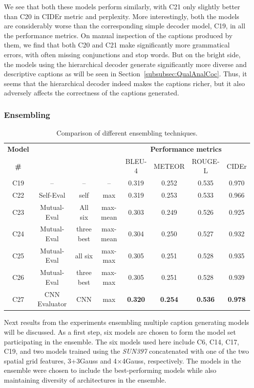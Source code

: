 We see that both these models perform similarly, with C21 only slightly better
than C20 in CIDEr metric and perplexity.
More interestingly, both the models are considerably worse than the
corresponding simple decoder model, C19, in all the performance metrics.
On manual inspection of the captions produced by them, we find that both C20 and
C21 make significantly more grammatical errors, with often missing conjunctions
and stop words.
But on the bright side, the models using the hierarchical decoder generate
significantly more diverse and descriptive captions as will be seen in
Section~\ref{subsubsec:QualAnalCoc}.
Thus, it seems that the hierarchical decoder indeed makes the captions richer,
but it also adversely affects the correctness of the captions generated.

\subsubsection{Ensembling}
\begin{table}[htp]
  \centering
  \newcommand{\bs}{\small}
  \begin{adjustbox}{center}
  \begin{tabular}{|c|c|c|c|c|c|c|c|}
    \hline
    \bf Model & \bf \multirow{2}{*}{Method} & \bf \multirow{2}{*}{Evaluators}&
    \bf \multirow{2}{*}{Eval type}  & \multicolumn{4}{c|}{\bf Performance metrics}\\
    \cline{5-8}
    \bf \# & & & &\bs BLEU-4 &\bs METEOR &\bs ROUGE-L &\bs CIDEr\\\hline
    C19 & --    & -- & -- & 0.319 & 0.252 & 0.535 & 0.970\\\hline
    C22 & Self-Eval & self      & max      & 0.319 & 0.253 & 0.533 & 0.966\\\hline
    C23 & Mutual-Eval      &  All six  & max-mean & 0.303 & 0.249 & 0.526 & 0.925\\
    C24 & Mutual-Eval      &three best & max-mean & 0.304 & 0.250 & 0.527 &
    0.932\\\cline{3-8}
    C25 & Mutual-Eval      & all six & max-max  & 0.305 & 0.251 & 0.528 & 0.935\\
    C26 & Mutual-Eval      & three best & max-max  & 0.305 & 0.251 & 0.528 & 0.939\\\hline
    C27 & CNN Evaluator    & CNN  & max&\bf0.320&\bf0.254 &\bf0.536 &\bf0.978\\\hline
  \end{tabular}
  \end{adjustbox}
  \caption{Comparison of different ensembling techniques.}
  \label{tab:resEnsembCocValset}
\end{table}
Next results from the experiments ensembling multiple caption generating models
will be discussed.
As a first step, six models are chosen to form the model set participating in
the ensemble.
The six models used here include C6, C14, C17, C19, and two models trained using
the \emph{SUN397} concatenated with one of the two spatial grid features, 3+3Gauss
and 4$\times$4Gauss, respectively.
The models in the ensemble were chosen to include the best-performing models
while also maintaining diversity of architectures in the ensemble.

